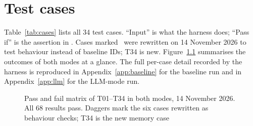 \chapter{Test cases}
\label{ch:testcases}

Table~\ref{tab:cases} lists all 34 test cases. ``Input'' is what the harness does; ``Pass if'' is the assertion in . Cases marked \dag\ were rewritten on 14 November 2026 to test behaviour instead of baseline IDs; T34 is new. Figure~\ref{fig:passmatrix} summarises the outcomes of both modes at a glance. The full per-case detail recorded by the harness is reproduced in Appendix~\ref{app:baseline} for the baseline run and in Appendix~\ref{app:llm} for the LLM-mode run.

\begin{figure}[htbp]
\centering

\caption{Pass and fail matrix of T01--T34 in both modes, 14 November 2026. All 68 results pass. Daggers mark the six cases rewritten as behaviour checks; T34 is the new memory case}
\label{fig:passmatrix}
\end{figure}

